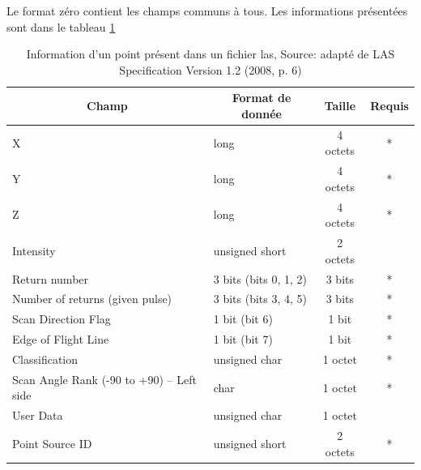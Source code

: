 Le format zéro contient les champs communs à tous. Les informations présentées sont dans le tableau \ref{tab:las_point_data}
\begin{table}[htbp!]
\centering
\begin{tabular}{|l|l|c|c|}
\hline
\multicolumn{1}{|c|}{\textbf{Champ}}     & \multicolumn{1}{c|}{\textbf{Format de donnée}} & \textbf{Taille} & \textbf{Requis} \\ \hline
X                                        & long                                           & 4 octets        & *               \\ \hline
Y                                        & long                                           & 4 octets        & *               \\ \hline
Z                                        & long                                           & 4 octets        & *               \\ \hline
Intensity                                & unsigned short                                 & 2 octets        &                 \\ \hline
Return number                            & 3 bits (bits 0, 1, 2)                          & 3 bits          & *               \\ \hline
Number of returns (given pulse)          & 3 bits (bits 3, 4, 5)                          & 3 bits          & *               \\ \hline
Scan Direction Flag                      & 1 bit (bit 6)                                  & 1 bit           & *               \\ \hline
Edge of Flight Line                      & 1 bit (bit 7)                                  & 1 bit           & *               \\ \hline
Classification                           & unsigned char                                  & 1 octet         & *               \\ \hline
Scan Angle Rank (-90 to +90) – Left side & char                                           & 1 octet         & *               \\ \hline
User Data                                & unsigned char                                  & 1 octet         &                 \\ \hline
Point Source ID                          & unsigned short                                 & 2 octets        & *               \\ \hline
\end{tabular}
\caption{
Information d'un point présent dans un fichier \gls{las},
Source: adapté de LAS Specification Version 1.2 (2008, p. 6)}
\label{tab:las_point_data}
\end{table}

